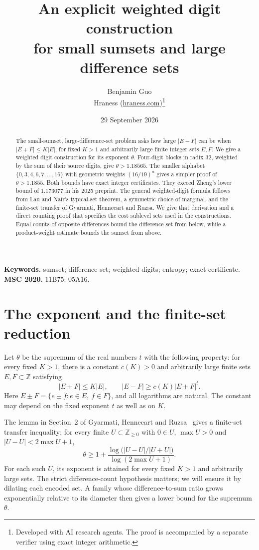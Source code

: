 \documentclass[11pt,a4paper]{article}
\title{An explicit weighted digit construction\\for small sumsets and large difference sets}
\author{Benjamin Guo\\Hraness (\url{hraness.com})\thanks{Developed with AI research agents. The proof is accompanied by a separate verifier using exact integer arithmetic.}}
\date{29 September 2026}
\newcommand{\Z}{\mathbb Z}
\begin{document}
\maketitle
\begin{abstract}
The small-sumset, large-difference-set problem asks how large $|E-F|$ can be
when $|E+F|\le K|E|$, for fixed $K>1$ and arbitrarily large finite integer
sets $E,F$. We give a weighted digit construction for its exponent $\theta$.
Four-digit blocks in radix $32$, weighted by the sum of their source digits, give
$\theta>1.18565$. The smaller alphabet $\{0,3,4,6,7,\ldots,16\}$ with
geometric weights $(16/19)^a$ gives a simpler proof of $\theta>1.1855$.
Both bounds have exact integer certificates. They exceed Zheng's
lower bound of $1.173077$ in his 2025 preprint.
The general weighted-digit formula follows from Lau and Nair's typical-set
theorem, a symmetric choice of marginal, and the finite-set transfer of
Gyarmati, Hennecart and Ruzsa. We give that derivation and a direct counting
proof that specifies the cost sublevel sets used in the constructions.
Equal counts of opposite differences bound the difference set from below,
while a product-weight estimate bounds the sumset from above.
\end{abstract}
\medskip\noindent\textbf{Keywords.} sumset; difference set; weighted digits; entropy; exact certificate.
\smallskip\noindent\textbf{MSC 2020.} 11B75; 05A16.

\section{The exponent and the finite-set reduction}
Let $\theta$ be the supremum of the real numbers $t$ with the following
property: for every fixed $K>1$, there is a constant $c(K)>0$ and arbitrarily
large finite sets $E,F\subset\Z$ satisfying
\begin{equation}\label{eq:problem}
 |E+F|\le K|E|,
 \qquad
 |E-F|\ge c(K)|E+F|^t.
\end{equation}
Here $E\pm F=\{e\pm f:e\in E,\ f\in F\}$, and all logarithms are natural.
The constant may depend on the fixed exponent $t$ as well as on $K$.

The lemma in Section~2 of Gyarmati, Hennecart and Ruzsa~\cite{ghr} gives
a finite-set transfer inequality: for every finite $U\subset\Z_{\ge0}$
with $0\in U$, $\max U>0$ and $|U-U|<2\max U+1$,
\begin{equation}\label{eq:transfer}
 \theta\ge
 1+\frac{\log\bigl(|U-U|/|U+U|\bigr)}{\log(2\max U+1)}.
\end{equation}
For each such $U$, its exponent is attained for every fixed $K>1$ and
arbitrarily large sets. The strict difference-count hypothesis matters;
we will ensure it by dilating each encoded set. A family whose
difference-to-sum ratio grows exponentially relative to its diameter
then gives a lower bound for the supremum $\theta$.
\end{document}
